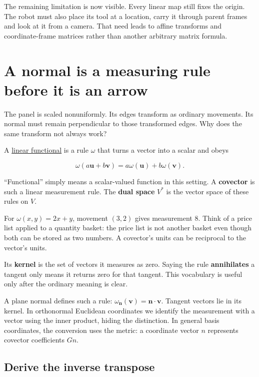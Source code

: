 The remaining limitation is now visible. Every linear map still fixes the origin. The robot must also place its tool at a location, carry it through parent frames and look at it from a camera. That need leads to affine transforms and coordinate-frame matrices rather than another arbitrary matrix formula.

\section{A normal is a measuring rule before it is an arrow}\label{01-foundations-i-ch018-a-normal-is-a-measuring-rule-before-it-is-an-arrow}

The panel is scaled nonuniformly. Its edges transform as ordinary movements. Its normal must remain perpendicular to those transformed edges. Why does the same transform not always work?

A \hyperref[01-foundations-i-ch019-normals-undo-scale-before-following-rotation]{linear functional} is a rule \(\omega\) that turns a vector into a scalar and obeys

\[
\omega(a\mathbf u+b\mathbf v)=a\omega(\mathbf u)+b\omega(\mathbf v).
\]

``Functional'' simply means a scalar-valued function in this setting. A \textbf{covector} is such a linear measurement rule. The \textbf{dual space} \(V^*\) is the vector space of these rules on \(V\).

For \(\omega(x,y)=2x+y\), movement \((3,2)\) gives measurement \(8\). Think of a price list applied to a quantity basket: the price list is not another basket even though both can be stored as two numbers. A covector's units can be reciprocal to the vector's units.

Its \textbf{kernel} is the set of vectors it measures as zero. Saying the rule \textbf{annihilates} a tangent only means it returns zero for that tangent. This vocabulary is useful only after the ordinary meaning is clear.

A plane normal defines such a rule: \(\omega_{\mathbf n}(\mathbf v)=\mathbf n\cdot\mathbf v\). Tangent vectors lie in its kernel. In orthonormal Euclidean coordinates we identify the measurement with a vector using the inner product, hiding the distinction. In general basis coordinates, the conversion uses the metric: a coordinate vector \(n\) represents covector coefficients \(Gn\).

\subsection{Derive the inverse transpose}\label{01-foundations-i-ch018-derive-the-inverse-transpose}

